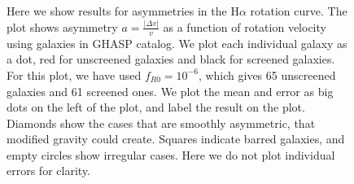 \documentclass[useAMS,usenatbib,twocolumn]{mn2e}
\newcommand{\vinusays}[1]{{\color{blue}[Vinu says: #1]}}
\newcommand{\ha}{H$\alpha$}
\begin{document}
\begin{figure}
\caption{Here we show results for asymmetries in the H$\alpha$ rotation curve.
The plot shows asymmetry $a=\frac{|\Delta v|}{v}$ as a function of rotation
velocity using galaxies in GHASP catalog. We plot each individual galaxy as a
dot, red for unscreened galaxies and black for screened galaxies. For this
plot, we have used $f_{R0}=10^{-6}$, which gives 65 unscreened galaxies and 61
screened ones. We plot the mean and error as big dots on the left of the plot,
and label the result on the plot. Diamonds show the cases that are smoothly
asymmetric, that modified gravity could create. Squares indicate barred
galaxies, and empty circles show irregular cases. Here we do not plot
individual errors for clarity.
\label{fig:plotsGHASP}}
\end{figure}

% 
\end{document}
